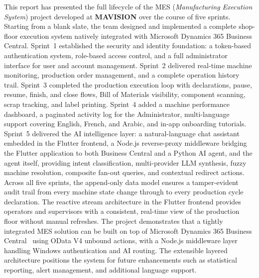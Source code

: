 \documentclass[12pt,a4paper]{report}
\newcommand{\CompanyName}{MAVISION}
\begin{document}
This report has presented the full lifecycle of the MES (\textit{Manufacturing
Execution System}) project developed at \textbf{\CompanyName{}} over the course
of five sprints. Starting from a blank slate, the team designed and implemented
a complete shop-floor execution system natively integrated with Microsoft
Dynamics 365 Business Central.
Sprint~1 established the security and identity foundation: a token-based
authentication system, role-based access control, and a full administrator
interface for user and account management. Sprint~2 delivered real-time machine
monitoring, production order management, and a complete operation history trail.
Sprint~3 completed the production execution loop with declarations, pause,
resume, finish, and close flows, Bill of Materials visibility, component scanning, scrap
tracking, and label printing. Sprint~4 added a
machine performance dashboard, a paginated activity log for the Administrator, multi-language support
covering English, French, and Arabic, and in-app onboarding tutorials.
Sprint~5 delivered the AI intelligence layer: a natural-language chat assistant
embedded in the Flutter frontend, a Node.js reverse-proxy middleware bridging
the Flutter application to both Business Central and a Python AI agent, and the
agent itself, providing intent classification, multi-provider LLM synthesis,
fuzzy machine resolution, composite fan-out queries, and contextual redirect
actions.
Across all five sprints, the append-only data model ensures a tamper-evident
audit trail from every machine state change through to every production cycle
declaration. The reactive stream architecture in the Flutter frontend provides
operators and supervisors with a consistent, real-time view of the production
floor without manual refreshes.
The project demonstrates that a tightly integrated MES solution can be built
on top of Microsoft Dynamics 365 Business Central~\cite{businesscentral} using OData V4 unbound
actions, with a Node.js middleware layer handling Windows authentication and
AI routing. The extensible layered architecture positions the system for future
enhancements such as statistical reporting, alert management, and additional
language support.
\end{document}
